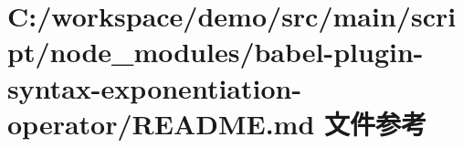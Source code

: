 \hypertarget{node__modules_2babel-plugin-syntax-exponentiation-operator_2_r_e_a_d_m_e_8md}{}\section{C\+:/workspace/demo/src/main/script/node\+\_\+modules/babel-\/plugin-\/syntax-\/exponentiation-\/operator/\+R\+E\+A\+D\+ME.md 文件参考}
\label{node__modules_2babel-plugin-syntax-exponentiation-operator_2_r_e_a_d_m_e_8md}
